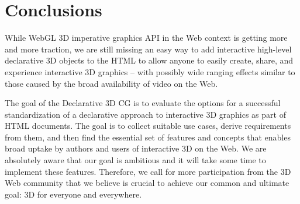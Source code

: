 \documentclass[review]{acmsiggraph}
\begin{document}
\section{Conclusions}

\label{sec:Conclusions}
While WebGL 3D imperative graphics API in the Web context is getting more and more traction, we are still missing an easy way to add interactive high-level declarative 3D objects to the HTML to allow anyone to easily create, share, and experience interactive 3D graphics – with possibly wide ranging effects similar to those caused by the broad availability of video on the Web.

The goal of the Declarative 3D CG is to evaluate the options for a successful standardization of a declarative approach to interactive 3D graphics as part of HTML documents. The goal is to collect suitable use cases, derive requirements from them, and then find the essential set of features and concepts that enables broad uptake by authors and users of interactive 3D on the Web.
We are absolutely aware that our goal is ambitious and it will take some time to implement these features. Therefore, we call for more participation from the 3D Web community that we believe is crucial to achieve our common and ultimate goal: 3D for everyone and everywhere.




\end{document}
